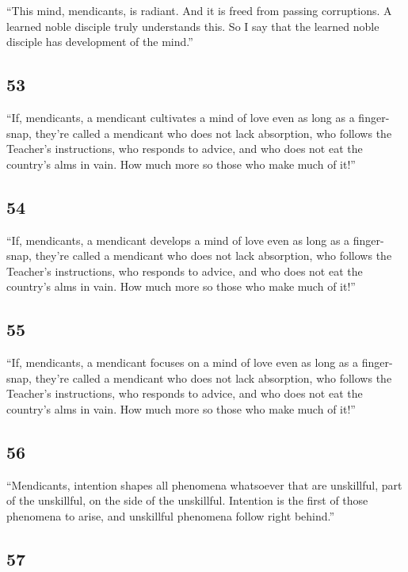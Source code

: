\documentclass[12pt,openany]{book}%
\begin{document}
“This mind, mendicants, is radiant. And it is freed from passing corruptions. A learned noble disciple truly understands this. So I say that the learned noble disciple has development of the mind.” 

\subsection*{53 }

“If, mendicants, a mendicant cultivates a mind of love even as long as a finger-snap, they’re called a mendicant who does not lack absorption, who follows the Teacher’s instructions, who responds to advice, and who does not eat the country’s alms in vain. How much more so those who make much of it!” 

\subsection*{54 }

“If, mendicants, a mendicant develops a mind of love even as long as a finger-snap, they’re called a mendicant who does not lack absorption, who follows the Teacher’s instructions, who responds to advice, and who does not eat the country’s alms in vain. How much more so those who make much of it!” 

\subsection*{55 }

“If, mendicants, a mendicant focuses on a mind of love even as long as a finger-snap, they’re called a mendicant who does not lack absorption, who follows the Teacher’s instructions, who responds to advice, and who does not eat the country’s alms in vain. How much more so those who make much of it!” 

\subsection*{56 }

“Mendicants, intention shapes all phenomena whatsoever that are unskillful, part of the unskillful, on the side of the unskillful. Intention is the first of those phenomena to arise, and unskillful phenomena follow right behind.” 

\subsection*{57 }
\end{document}

